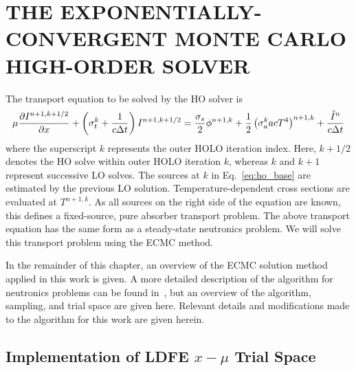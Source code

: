 
\chapter{\uppercase {The Exponentially-Convergent Monte Carlo High-Order Solver}}

The transport equation to be solved by the HO solver is
\begin{equation}\label{eq:ho_base}
\mu \frac{\partial I^{n+1,k+1/2}}{\partial x} + \left(\sigma_t^k + \frac{1}{c \Delta t }\right)
I^{n+1,k+1/2}
= \frac{\sigma_s}{2} \phi^{n+1,k} +\frac{1}{2} \left(\sigma_a^k a c T^4
\right)^{n+1,k} + \frac{\tilde I^n}{c\Delta t} 
\end{equation}
where the superscript $k$ represents the outer HOLO iteration index.  Here, $k+1/2$ denotes the
HO solve within outer HOLO iteration $k$, whereas $k$ and $k+1$ represent successive LO
solves. The sources at $k$ in Eq.~\eqref{eq:ho_base} are estimated by the previous LO
solution. Temperature-dependent cross sections are
evaluated at $T^{n+1,k}$.  As all sources on the right side of the equation are known,
this defines a fixed-source, pure absorber transport problem.  The above transport equation has
the same form as a steady-state neutronics problem.  We will solve
this transport problem using the ECMC method. 

In the remainder of this chapter, an overview of
the ECMC solution method applied in this work is given. A more detailed description of the
algorithm for neutronics problems can be found in~\cite{jake}, but an overview of the algorithm, sampling, and
trial space are given here.  Relevant details and modifications made to the
algorithm for this work are given herein.

\section{Implementation of LDFE $x-\mu$ Trial Space}


